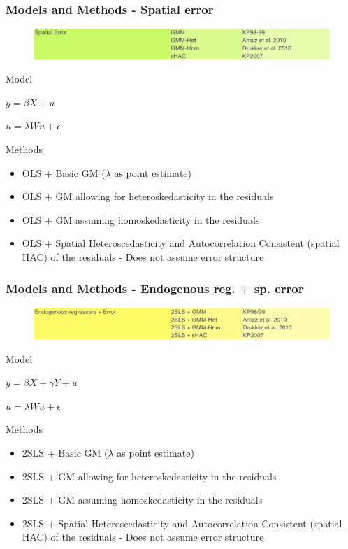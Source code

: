 \documentclass[nototal]{beamer}
\begin{document}
\begin{frame}
	\frametitle{Models and Methods - Spatial error}
  \begin{figure}
  \includegraphics[width=1\linewidth]{figs/models_se.png}
  \end{figure}
 
\begin{block}{Model}
  \begin{center}
  $y = \beta X + u$
 
  $u = \lambda W u + \epsilon$
  \end{center}
 \end{block} 
\begin{block}{Methods}
 \begin{itemize}
 \item  OLS + Basic GM ($\lambda$ as point estimate)
 \item  OLS + GM allowing for heteroskedasticity in the residuals
 \item  OLS + GM assuming homoskedasticity in the residuals
 \item  OLS + Spatial Heteroscedasticity and Autocorrelation Consistent (spatial HAC) of the residuals - Does not assume error structure
 \end{itemize}
 \end{block} \end{frame} 

\begin{frame}
	\frametitle{Models and Methods - Endogenous reg. + sp. error}
  \begin{figure}
  \includegraphics[width=1\linewidth]{figs/models_end_se.png}
  \end{figure}
 
\begin{block}{Model}
  \begin{center}
  $y = \beta X + \gamma Y + u$
 
  $u = \lambda W u + \epsilon$
  \end{center}
 \end{block} 
\begin{block}{Methods}
 \begin{itemize}
 \item  2SLS + Basic GM ($\lambda$ as point estimate)
 \item  2SLS + GM allowing for heteroskedasticity in the residuals
 \item  2SLS + GM assuming homoskedasticity in the residuals
 \item  2SLS + Spatial Heteroscedasticity and Autocorrelation Consistent (spatial HAC) of the residuals - Does not assume error structure
 \end{itemize}
 \end{block} \end{frame} 
\end{document}
